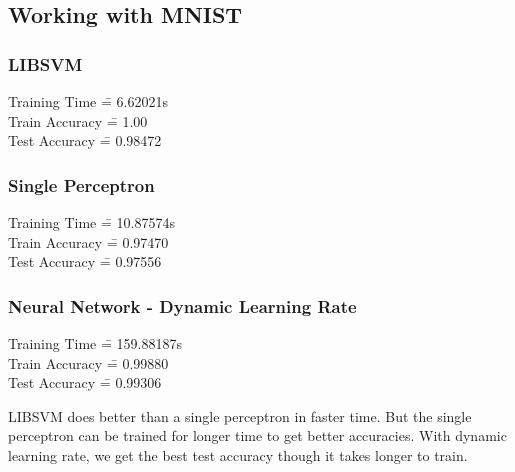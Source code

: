 \documentclass[12pt]{article}
\begin{document}
\subsection*{Working with MNIST}
\subsubsection*{LIBSVM}
\begin{addmargin}[0.3in]{0in}
\begin{tabbing}
Training Time \quad \= = 6.62021s \\
Train Accuracy \= = 1.00 \\
Test Accuracy \= = 0.98472
\end{tabbing}
\end{addmargin}
\subsubsection*{Single Perceptron}
\begin{addmargin}[0.3in]{0in}
\begin{tabbing}
Training Time \quad \= = 10.87574s \\
Train Accuracy \= = 0.97470 \\
Test Accuracy \= = 0.97556
\end{tabbing}
\end{addmargin}
\subsubsection*{Neural Network - Dynamic Learning Rate}
\begin{addmargin}[0.3in]{0in}
\begin{tabbing}
Training Time \quad \= = 159.88187s \\
Train Accuracy \= = 0.99880 \\
Test Accuracy \= = 0.99306
\end{tabbing}
\end{addmargin}
\vspace{5mm}
\begin{addmargin}[0.3in]{0in}
LIBSVM does better than a single perceptron in faster time. But the single perceptron can be trained for longer time to get better accuracies. With dynamic learning rate, we get the best test accuracy though it takes longer to train.
\end{addmargin}
\end{document}
